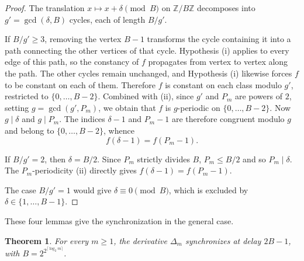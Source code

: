 \documentclass[12pt,reqno]{article}
\theoremstyle{plain}
\newtheorem{theorem}{Theorem}[section]
\theoremstyle{definition}
\begin{document}
\begin{proof}
The translation $x \mapsto x + \delta \pmod B$ on $\mathbb{Z} / B \mathbb{Z}$ decomposes into $g' = \gcd(\delta, B)$ cycles, each of length $B / g'$.

If $B / g' \ge 3$, removing the vertex $B - 1$ transforms the cycle containing it into a path connecting the other vertices of that cycle. Hypothesis {\rm(i)} applies to every edge of this path, so the constancy of $f$ propagates from vertex to vertex along the path. The other cycles remain unchanged, and Hypothesis {\rm(i)} likewise forces $f$ to be constant on each of them. Therefore $f$ is constant on each class modulo $g'$, restricted to $\{0, \dots, B - 2\}$. Combined with {\rm(ii)}, since $g'$ and $P_m$ are powers of $2$, setting $g = \gcd(g', P_m)$, we obtain that $f$ is $g$-periodic on $\{0, \dots, B - 2\}$. Now $g \mid \delta$ and $g \mid P_m$. The indices $\delta - 1$ and $P_m - 1$ are therefore congruent modulo $g$ and belong to $\{0, \dots, B - 2\}$, whence
\[
  f(\delta - 1) = f(P_m - 1).
\]

If $B / g' = 2$, then $\delta = B / 2$. Since $P_m$ strictly divides $B$, $P_m \le B / 2$ and so $P_m \mid \delta$. The $P_m$-periodicity {\rm(ii)} directly gives $f(\delta - 1) = f(P_m - 1)$.

The case $B / g' = 1$ would give $\delta \equiv 0 \pmod B$, which is excluded by $\delta \in \{1, \dots, B - 1\}$.
\end{proof}

These four lemmas give the synchronization in the general case.

\begin{theorem}
\label{thm:dnc-general}
For every $m \ge 1$, the derivative $\Delta_m$ synchronizes at delay
$2B - 1$, with $B = 2^{2^{\lceil \log_2 m \rceil}}$.
\end{theorem}
\end{document}
